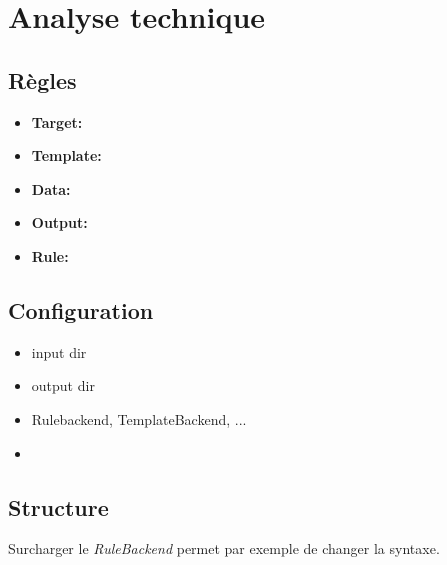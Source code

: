 \section{Analyse technique}

	\subsection{Règles}
		\begin{itemize}
			\item \textbf{Target:}
			\item \textbf{Template:}
			\item \textbf{Data:}
			\item \textbf{Output:}
			\item \textbf{Rule:} 
		\end{itemize}
	
	\subsection{Configuration}
	
		\begin{itemize}
			\item input dir
			\item output dir
			\item Rulebackend, TemplateBackend, ...
			\item 
		\end{itemize}
	
	\subsection{Structure}
	
	Surcharger le \textit{RuleBackend} permet par exemple de changer la syntaxe.